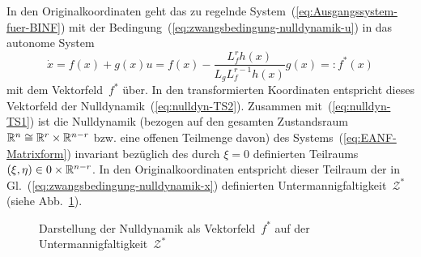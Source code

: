 In den Originalkoordinaten geht das zu regelnde System~(\ref{eq:Ausgangssystem-fuer-BINF})
mit der Bedingung~(\ref{eq:zwangsbedingung-nulldynamik-u}) in das
autonome System 
\begin{equation}
\dot{x}=f(x)+g(x)u=f(x)-\frac{L_{f}^{r}h(x)}{L_{g}L_{f}^{r-1}h(x)}g(x)=:f^{*}(x)\label{eq:nulldynamik-f-stern}
\end{equation}
mit dem Vektorfeld~$f^{*}$ über. In den transformierten Koordinaten
entspricht dieses Vektorfeld der Nulldynamik~(\ref{eq:nulldyn-TS2}).
Zusammen mit~(\ref{eq:nulldyn-TS1}) ist die Nulldynamik (bezogen
auf den gesamten Zustandsraum ${\mathbb{R}}^{n}\cong{\mathbb{R}}^{r}\times{\mathbb{R}}^{n-r}$ bzw.
eine offenen Teilmenge davon) des Systems~(\ref{eq:EANF-Matrixform})
invariant bezüglich des durch $\xi=0$ definierten Teilraums $(\xi,\eta)\in0\times{\mathbb{R}}^{n-r}$.
In den Originalkoordinaten entspricht dieser Teilraum der in Gl.~(\ref{eq:zwangsbedingung-nulldynamik-x})
definierten Untermannigfaltigkeit~$\mathcal{Z}^{*}$ (siehe Abb.~\ref{fig:Nulldynamik}).

\begin{figure}
\begin{centering}
\resizebox{0.85\textwidth}{!}{}
\par\end{centering}
\caption{Darstellung der Nulldynamik als Vektorfeld~$f^{*}$
auf der Untermannigfaltigkeit~$\mathcal{Z}^{*}$\label{fig:Nulldynamik}}

\end{figure}

